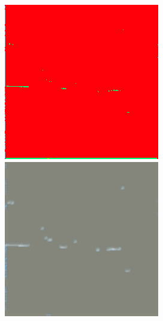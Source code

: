 \begin{figure}
    \includegraphics[width=\WnetPredictionsImageWidth]{images/wnet/46d-20/102574-prediction} \hfill
    \includegraphics[width=\WnetPredictionsImageWidth]{images/wnet/46d-20/102574-restored}


\end{figure}
